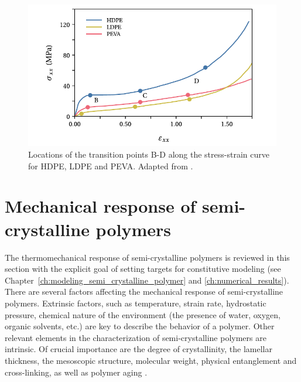 \begin{figure}[htbp]
	\centering
	\includegraphics[width=\textwidth]{figures/stress_strain_curve_strobl}
	\caption{Locations of the transition points B-D along the stress-strain curve for HDPE, LDPE and PEVA. Adapted from \cite{hissNetworkStretchingSlip1999}.}
\label{fig:stress_strain_curve_strobl}
\end{figure}

\section{Mechanical response of semi-crystalline polymers}

The thermomechanical response of semi-crystalline polymers is reviewed in this section with the explicit goal of setting targets for constitutive modeling (see Chapter~\ref{ch:modeling_semi_crystalline_polymer} and \ref{ch:numerical_results}).
There are several factors affecting the mechanical response of semi-crystalline polymers.
Extrinsic factors, such as temperature, strain rate, hydrostatic pressure, chemical nature of the environment (the presence of water, oxygen, organic solvents, etc.) are key to describe the behavior of a polymer.
Other relevant elements in the characterization of semi-crystalline polymers are intrinsic.
Of crucial importance are the degree of crystallinity, the lamellar thickness, the mesoscopic structure, molecular weight, physical entanglement and cross-linking, as well as polymer aging \citep{ayoubEffectsCrystalContent2011, serbanTensilePropertiesSemicrystalline2013, callister2014materials, cundiffModelingViscoplasticBehavior2022}.

